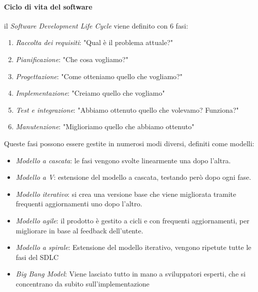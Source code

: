 \documentclass{article}
\begin{document}
            \paragraph{Ciclo di vita del software} il \textit{Software Development Life Cycle} viene definito con 6 fasi:
                \begin{enumerate}
                    \item \textit{Raccolta dei requisiti}: "Qual è il problema attuale?"
                    \item \textit{Pianificazione}: "Che cosa vogliamo?"
                    \item \textit{Progettazione}: "Come otteniamo quello che vogliamo?"
                    \item \textit{Implementazione}: "Creiamo quello che vogliamo"
                    \item \textit{Test e integrazione}: "Abbiamo ottenuto quello che volevamo? Funziona?"
                    \item \textit{Manutenzione}: "Miglioriamo quello che abbiamo ottenuto"
                \end{enumerate}
                Queste fasi possono essere gestite in numerosi modi diversi, definiti come modelli:
                \begin{itemize}
                    \item \textit{Modello a cascata}: le fasi vengono svolte linearmente una dopo l'altra.
                    \item \textit{Modello a V}: estensione del modello a cascata, testando però dopo ogni fase.
                    \item \textit{Modello iterativo}: si crea una versione base che viene migliorata tramite frequenti aggiornamenti uno dopo l'altro.
                    \item \textit{Modello agile}: il prodotto è gestito a cicli e con frequenti aggiornamenti, per  migliorare in base al feedback dell'utente.
                    \item \textit{Modello a spirale}: Estensione del modello iterativo, vengono ripetute tutte le fasi del SDLC
                    \item \textit{Big Bang Model}: Viene lasciato tutto in mano a sviluppatori esperti, che si concentrano da subito sull'implementazione
                \end{itemize}
\end{document}
